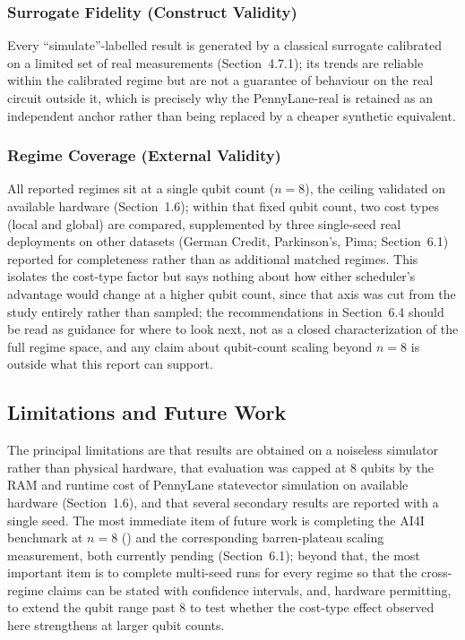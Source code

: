 \subsubsection{Surrogate Fidelity (Construct Validity)}
Every ``simulate''-labelled result is generated by a classical surrogate calibrated on a limited set of real measurements (Section~4.7.1); its trends are reliable within the calibrated regime but are not a guarantee of behaviour on the real circuit outside it, which is precisely why the PennyLane-real  is retained as an independent anchor rather than being replaced by a cheaper synthetic equivalent.

\subsubsection{Regime Coverage (External Validity)}
All reported regimes sit at a single qubit count ($n=8$), the ceiling validated on available hardware (Section~1.6); within that fixed qubit count, two cost types (local and global) are compared, supplemented by three single-seed real deployments on other datasets (German Credit, Parkinson's, Pima; Section~6.1) reported for completeness rather than as additional matched regimes. This isolates the cost-type factor but says nothing about how either scheduler's advantage would change at a higher qubit count, since that axis was cut from the study entirely rather than sampled; the recommendations in Section~6.4 should be read as guidance for where to look next, not as a closed characterization of the full regime space, and any claim about qubit-count scaling beyond $n=8$ is outside what this report can support.

\subsection{Limitations and Future Work}
The principal limitations are that results are obtained on a noiseless simulator rather than physical hardware, that evaluation was capped at 8 qubits by the RAM and runtime cost of PennyLane statevector simulation on available hardware (Section~1.6), and that several secondary results are reported with a single seed. The most immediate item of future work is completing the AI4I benchmark at $n=8$ () and the corresponding barren-plateau scaling measurement, both currently pending (Section~6.1); beyond that, the most important item is to complete multi-seed runs for every regime so that the cross-regime claims can be stated with confidence intervals, and, hardware permitting, to extend the qubit range past 8 to test whether the cost-type effect observed here strengthens at larger qubit counts.

